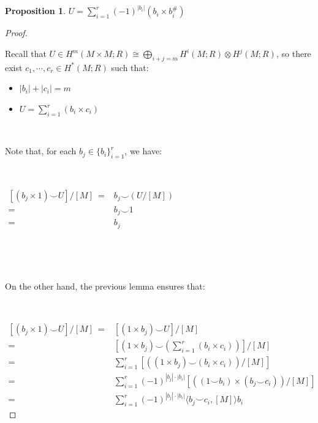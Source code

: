 \documentclass[12pt,oneside]{book}
\newtheorem{prop}   {Proposition}[chapter]
\newcommand{\ds}{\displaystyle}
\newcommand{\ccup}{\smile}
\newcommand{\tensor}{\otimes}
\begin{document}
    \begin{prop}\label{lema_para_euler}
    	$U = \ds\sum_{i=1}^{r} (-1)^{|b_{i}|} \left( b_{i} \times b_{i}^{\#} \right)$
    \end{prop}

    \begin{proof}

        \

        Recall that $U \in H^{m}(M \times M; R) \cong \ds\bigoplus_{i+j=m} H^{i}(M; R) \tensor H^{j}(M; R)$, so there exist 
        $c_{1}, \cdots, c_{r} \in H^{*}(M; R)$ such that:
        
        \begin{itemize}
            \item $|b_{i}| + |c_{i}| = m$
            \item $U = \ds\sum_{i=1}^{r} \left( b_{i} \times c_{i} \right)$
        \end{itemize}

        \        
        
        Note that, for each $b_{j} \in \{b_{i}\}_{i=1}^{r}$, we have:

        \

        $\begin{array}{rl}
        	\left[ (b_{j} \times 1) \ccup U \right]/[M] \ = & b_{j} \ccup (U/[M]) \\
        	= & b_{j} \ccup 1 \\
        	= & b_{j}
        \end{array}$

        \

        \

        On the other hand, the previous lemma ensures that:

        \
 
        $\begin{array}{rl}
        	\left[ (b_{j} \times 1) \ccup U \right]/[M] \ = & \left[ (1 \times b_{j}) \ccup U \right]/[M] \\
        	= & \left[ (1 \times b_{j}) \ccup \left( \ds\sum_{i=1}^{r} \left( b_{i} \times c_{i} \right) \right) \right]/[M] \\
        	= & \ds\sum_{i=1}^{r} \left[ \left( (1 \times b_{j}) \ccup (b_{i} \times c_{i}) \right)/[M] \right] \\
        	= & \ds\sum_{i=1}^{r} (-1)^{|b_{j}| \cdot |b_{i}|} \left[ \left( (1 \ccup b_{i}) \times (b_{j} \ccup c_{i}) \right)/[M] \right] \\
        	= & \ds\sum_{i=1}^{r} (-1)^{|b_{j}| \cdot |b_{i}|} \langle b_{j} \ccup c_{i}, [M] \rangle b_{i}
        \end{array}$


\end{proof}
\end{document}
